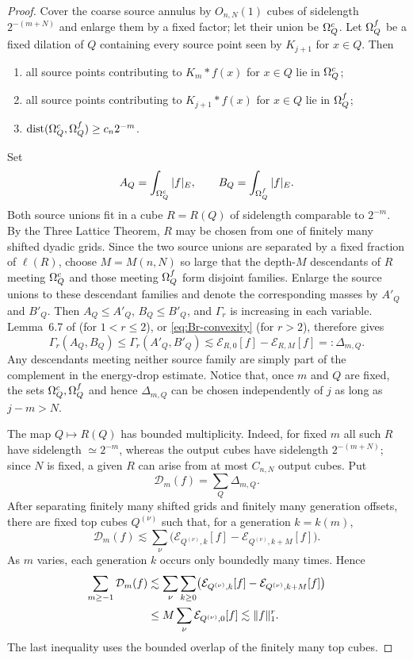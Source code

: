 \documentclass[10pt,a4paper]{amsart}
\numberwithin{equation}{section}
\newcommand{\dist}{\operatorname{dist}}
\newcommand{\norm}[1]{\lVert #1\rVert}
\begin{document}
\begin{proof}
Cover the coarse source annulus by $O_{n,N}(1)$ cubes of sidelength
$2^{-(m+N)}$ and enlarge them by a fixed factor; let their union be
$\Omega_Q^{\rm c}$.  Let $\Omega_Q^{\rm f}$ be a fixed dilation of $Q$
containing every source point seen by $K_{j+1}$ for $x\in Q$.  Then
\begin{enumerate}[label=\textup{(\roman*)},leftmargin=2.4em]
\item all source points contributing to $K_m*f(x)$ for $x\in Q$ lie in
      $\Omega_Q^{\rm c}$;
\item all source points contributing to $K_{j+1}*f(x)$ for $x\in Q$ lie in
      $\Omega_Q^{\rm f}$;
\item $\dist(\Omega_Q^{\rm c},\Omega_Q^{\rm f})\ge c_n2^{-m}$.
\end{enumerate}
Set
\[
 A_Q=\int_{\Omega_Q^{\rm c}}|f|_E,
 \qquad B_Q=\int_{\Omega_Q^{\rm f}}|f|_E.
\]
Both source unions fit in a cube $R=R(Q)$ of sidelength comparable to
$2^{-m}$.  By the Three Lattice Theorem, $R$ may be chosen from one of
finitely many shifted dyadic grids.  Since the two source unions are separated by a fixed fraction of
$\ell(R)$, choose $M=M(n,N)$ so large that the depth-$M$ descendants of $R$
meeting $\Omega_Q^{\rm c}$ and those meeting $\Omega_Q^{\rm f}$ form disjoint
families.  Enlarge the source unions to these descendant families and denote
the corresponding masses by $A'_Q$ and $B'_Q$.  Then
$A_Q\le A'_Q$, $B_Q\le B'_Q$, and $\Gamma_r$ is increasing in each variable.
Lemma~6.7 of \cite{Stolyarov24} (for $1<r\le2$), or
\eqref{eq:Br-convexity} (for $r>2$), therefore gives
\begin{equation}\label{eq:AB-energy}
 \Gamma_r(A_Q,B_Q)
 \le \Gamma_r(A'_Q,B'_Q)
 \lesssim \mathcal E_{R,0}[f]-\mathcal E_{R,M}[f]
 =:\Delta_{m,Q}.
\end{equation}
Any descendants meeting neither source family are simply part of the
complement in the energy-drop estimate.  Notice that, once $m$ and $Q$ are
fixed, the sets $\Omega_Q^{\rm c},\Omega_Q^{\rm f}$ and hence
$\Delta_{m,Q}$ can be chosen independently of $j$ as long as $j-m>N$.

The map $Q\mapsto R(Q)$ has bounded multiplicity.  Indeed, for fixed $m$ all
such $R$ have sidelength $\simeq2^{-m}$, whereas the output cubes have
sidelength $2^{-(m+N)}$; since $N$ is fixed, a given $R$ can arise from at
most $C_{n,N}$ output cubes.  Put
\[
 \mathcal D_m(f)=\sum_Q\Delta_{m,Q}.
\]
After separating finitely many shifted grids and finitely many generation
offsets, there are fixed top cubes $Q^{(\nu)}$ such that, for a generation
$k=k(m)$,
\[
 \mathcal D_m(f)
 \lesssim \sum_\nu
 \bigl(\mathcal E_{Q^{(\nu)},k}[f]
       -\mathcal E_{Q^{(\nu)},k+M}[f]\bigr).
\]
As $m$ varies, each generation $k$ occurs only boundedly many times.  Hence
\begin{align}
 \sum_{m\ge-1}\mathcal D_m(f)
 &\lesssim \sum_\nu\sum_{k\ge0}
 \bigl(\mathcal E_{Q^{(\nu)},k}[f]
       -\mathcal E_{Q^{(\nu)},k+M}[f]\bigr)\notag\\
 &\le M\sum_\nu \mathcal E_{Q^{(\nu)},0}[f]
 \lesssim \norm f_1^r.                                      \label{eq:Dm-positive}
\end{align}
The last inequality uses the bounded overlap of the finitely many top cubes.


\end{proof}
\end{document}
